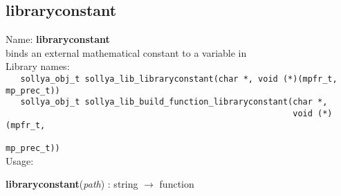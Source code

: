 \subsection{libraryconstant}
\label{lablibraryconstant}
\noindent Name: \textbf{libraryconstant}\\
\phantom{aaa}binds an external mathematical constant to a variable in \sollya\\[0.2cm]
\noindent Library names:\\
\verb|   sollya_obj_t sollya_lib_libraryconstant(char *, void (*)(mpfr_t, mp_prec_t))|\\
\verb|   sollya_obj_t sollya_lib_build_function_libraryconstant(char *,|\\
\verb|                                                          void (*)(mpfr_t,|\\
\verb|                                                                   mp_prec_t))|\\[0.2cm]
\noindent Usage: 
\begin{center}
\textbf{libraryconstant}(\emph{path}) : \textsf{string} $\rightarrow$ \textsf{function}\\
\end{center}

